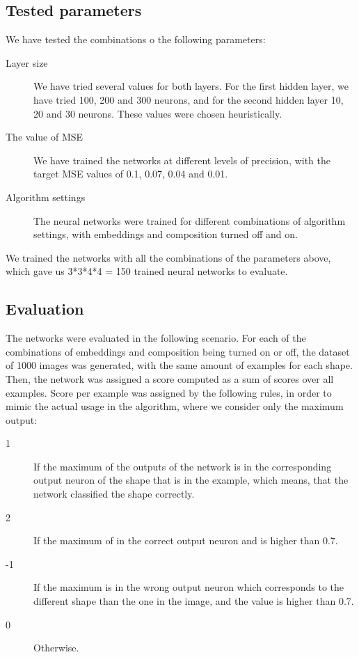 \subsection{Tested parameters}
We have tested the combinations o the following parameters:
\begin{description}
\item [Layer size] We have tried several values for both layers. For the first hidden layer, we have tried 100, 200 and 300 neurons, and for the second hidden layer 10, 20 and 30 neurons. These values were chosen heuristically.
\item [The value of MSE] We have trained the networks at different levels of precision, with the target MSE values of 0.1, 0.07, 0.04 and 0.01.
\item [Algorithm settings] The neural networks were trained for different combinations of algorithm settings, with embeddings and composition turned off and on.
\end{description}
We trained the networks with all the combinations of the parameters above, which gave us 3*3*4*4 = 150 trained neural networks to evaluate.

\subsection{Evaluation}
The networks were evaluated in the following scenario. For each of the combinations of embeddings and composition being turned on or off, the dataset of 1000 images was generated, with the same amount of examples for each shape. Then, the network was assigned a score computed as a sum of scores over all examples. Score per example was assigned by the following rules, in order to mimic the actual usage in the algorithm, where we consider only the maximum output:

\begin{description}
\item [1] If the maximum of the outputs of the network is in the corresponding output neuron of the shape that is in the example, which means, that the network classified the shape correctly.
\item [2] If the maximum of in the correct output neuron and is higher than 0.7. 
\item [-1] If the maximum is in the wrong output neuron which corresponds to the different shape than the one in the image, and the value is higher than 0.7.
\item [0] Otherwise.
\end{description}

